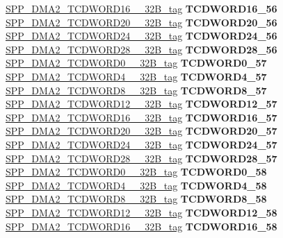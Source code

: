\begin{DoxyCompactItemize}
\begin{tabbing}
\>\>\mbox{\hyperlink{unionSPP__DMA2__TCDWORD16____32B__tag}{SPP\_DMA2\_TCDWORD16\_\_32B\_tag}} {\bfseries TCDWORD16\_56}\\
\>\>\mbox{\hyperlink{unionSPP__DMA2__TCDWORD20____32B__tag}{SPP\_DMA2\_TCDWORD20\_\_32B\_tag}} {\bfseries TCDWORD20\_56}\\
\>\>\mbox{\hyperlink{unionSPP__DMA2__TCDWORD24____32B__tag}{SPP\_DMA2\_TCDWORD24\_\_32B\_tag}} {\bfseries TCDWORD24\_56}\\
\>\>\mbox{\hyperlink{unionSPP__DMA2__TCDWORD28____32B__tag}{SPP\_DMA2\_TCDWORD28\_\_32B\_tag}} {\bfseries TCDWORD28\_56}\\
\>\>\mbox{\hyperlink{unionSPP__DMA2__TCDWORD0____32B__tag}{SPP\_DMA2\_TCDWORD0\_\_32B\_tag}} {\bfseries TCDWORD0\_57}\\
\>\>\mbox{\hyperlink{unionSPP__DMA2__TCDWORD4____32B__tag}{SPP\_DMA2\_TCDWORD4\_\_32B\_tag}} {\bfseries TCDWORD4\_57}\\
\>\>\mbox{\hyperlink{unionSPP__DMA2__TCDWORD8____32B__tag}{SPP\_DMA2\_TCDWORD8\_\_32B\_tag}} {\bfseries TCDWORD8\_57}\\
\>\>\mbox{\hyperlink{unionSPP__DMA2__TCDWORD12____32B__tag}{SPP\_DMA2\_TCDWORD12\_\_32B\_tag}} {\bfseries TCDWORD12\_57}\\
\>\>\mbox{\hyperlink{unionSPP__DMA2__TCDWORD16____32B__tag}{SPP\_DMA2\_TCDWORD16\_\_32B\_tag}} {\bfseries TCDWORD16\_57}\\
\>\>\mbox{\hyperlink{unionSPP__DMA2__TCDWORD20____32B__tag}{SPP\_DMA2\_TCDWORD20\_\_32B\_tag}} {\bfseries TCDWORD20\_57}\\
\>\>\mbox{\hyperlink{unionSPP__DMA2__TCDWORD24____32B__tag}{SPP\_DMA2\_TCDWORD24\_\_32B\_tag}} {\bfseries TCDWORD24\_57}\\
\>\>\mbox{\hyperlink{unionSPP__DMA2__TCDWORD28____32B__tag}{SPP\_DMA2\_TCDWORD28\_\_32B\_tag}} {\bfseries TCDWORD28\_57}\\
\>\>\mbox{\hyperlink{unionSPP__DMA2__TCDWORD0____32B__tag}{SPP\_DMA2\_TCDWORD0\_\_32B\_tag}} {\bfseries TCDWORD0\_58}\\
\>\>\mbox{\hyperlink{unionSPP__DMA2__TCDWORD4____32B__tag}{SPP\_DMA2\_TCDWORD4\_\_32B\_tag}} {\bfseries TCDWORD4\_58}\\
\>\>\mbox{\hyperlink{unionSPP__DMA2__TCDWORD8____32B__tag}{SPP\_DMA2\_TCDWORD8\_\_32B\_tag}} {\bfseries TCDWORD8\_58}\\
\>\>\mbox{\hyperlink{unionSPP__DMA2__TCDWORD12____32B__tag}{SPP\_DMA2\_TCDWORD12\_\_32B\_tag}} {\bfseries TCDWORD12\_58}\\
\>\>\mbox{\hyperlink{unionSPP__DMA2__TCDWORD16____32B__tag}{SPP\_DMA2\_TCDWORD16\_\_32B\_tag}} {\bfseries TCDWORD16\_58}\\

\end{tabbing}
\end{DoxyCompactItemize}
